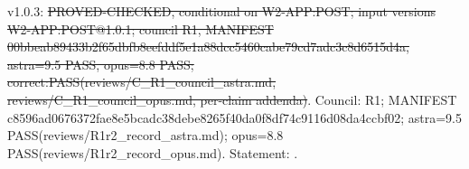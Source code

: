 \begin{theorem}\label{reg:W3-RM2_RM2-R}
\end{theorem}
\begin{statusbox}
 v1.0.3: \st{PROVED-CHECKED, conditional on W2-APP:POST; input versions W2-APP:POST@1.0.1; council R1, MANIFEST 00bbeab89433b2f65dbfb8eefddf5e1a88dcc5460cabe79cd7adc3c8d6515d4a, astra=9.5 PASS, opus=8.8 PASS; correct:PASS(reviews/C\_R1\_council\_astra.md, reviews/C\_R1\_council\_opus.md, per-claim addenda)}. Council: R1; MANIFEST c8596ad0676372fae8e5bcadc38debe8265f40da0f8df74c9116d08da4ccbf02; astra=9.5 PASS(reviews/R1r2\_record\_astra.md); opus=8.8 PASS(reviews/R1r2\_record\_opus.md). Statement: .
\end{statusbox}
